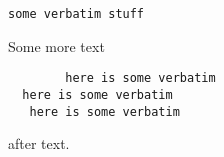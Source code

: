 \verb!some verbatim stuff!

Some more text
\begin{verbatim}
        here is some verbatim
  here is some verbatim
   here is some verbatim
\end{verbatim}
after text.
